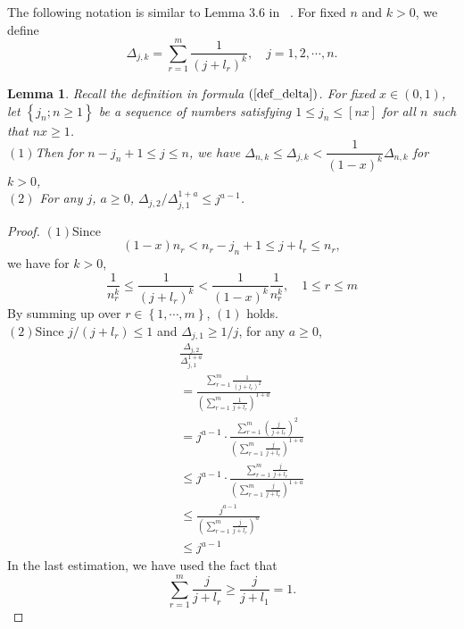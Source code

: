 \documentclass[12pt]{article}
\theoremstyle{plain}
\newtheorem{lem}{\textbf{Lemma}}
\theoremstyle{definition}
\theoremstyle{remark}
\begin{document}
The following notation is similar to Lemma 3.6 in ~\cite{SRP}. For
fixed $n$ and $k>0$, we define
\begin{equation}\label{def_delta}
\Delta_{j, k}=\sum_{r=1}^{m} \frac{1}{\left(j+l_{r}\right)^{k}}, \quad j=1,2, \cdots, n.
\end{equation}

\begin{lem}
    Recall the definition in formula $(\ref{def_delta})$. For fixed $x\in (0,1)$, let $\left\{j_{n} ; n \geq 1\right\}$ be a sequence of numbers satisfying $1\leq j_n\leq [nx]$ for all $n$ such that $nx\geq 1$. \\
    $(1)$Then for $n-j_n +1\leq j \leq n$, we have $\Delta_{n, k} \leq \Delta_{j, k}<\dfrac{1}{(1-x)^{k}} \Delta_{n, k}$ for $k>0$,\\
    $(2)$ For any $j$, $a\geq 0$, $\Delta_{j, 2} / \Delta_{j, 1}^{1+a} \leq j^{a-1}$.
\end{lem}
\begin{proof}
    $(1)$Since
    \begin{equation*}
        (1-x)n_r< n_{r}-j_{n}+1 \leq j+l_{r} \leq n_{r},
    \end{equation*}
    we have for $k>0$,
    \begin{equation*}
        \frac{1}{n_{r}^{k}} \leq \frac{1}{\left(j+l_{r}\right)^{k}}<\frac{1}{(1-x)^k}\frac{1}{ n_{r}^{k}}, \quad 1 \leq r \leq m
    \end{equation*}
    By summing up over $r \in\left\{1, \cdots, m\right\}$, $(1)$ holds.\\
    $(2)$Since $j /\left(j+l_{r}\right) \leq 1$ and $\Delta_{j,1} \geq 1 / j$, for any $a\geq 0$,
    \begin{eqnarray*}
        &&\frac{\Delta_{j, 2}}{\Delta_{j, 1}^{1+a}}\\
        &&=\frac{\sum_{r=1}^{m} \frac{1}{\left(j+l_{r}\right)^{2}}}{\left(\sum_{r=1}^{m} \frac{1}{j+l_{r}}\right)^{1+a}}\\
        &&=j^{a-1} \cdot \frac{\sum_{r=1}^{m}\left(\frac{j}{j+l_{r}}\right)^{2}}{\left(\sum_{r=1}^{m} \frac{j}{j+l_{r}}\right)^{1+a}} \\
        &&\leq j^{a-1} \cdot \frac{\sum_{r=1}^{m} \frac{j}{j+l_{r}}}{\left(\sum_{r=1}^{m} \frac{j}{j+l_{r}}\right)^{1+a}} \\
        &&\leq \frac{j^{a-1}}{\left(\sum_{r=1}^{m} \frac{j}{j+l_{r}}\right)^{a}} \\
        &&\leq j^{a-1}
    \end{eqnarray*}
    In the last estimation, we have used the fact that
    \begin{equation*}
        \sum_{r=1}^{m} \frac{j}{j+l_{r}} \geq \frac{j}{j+l_{1}}=1.
    \end{equation*}
\end{proof}
\end{document}
